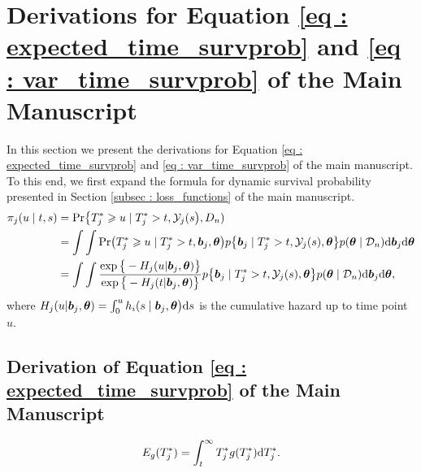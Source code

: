 \section{Derivations for Equation \ref{eq : expected_time_survprob} and \ref{eq : var_time_survprob} of the Main Manuscript}
In this section we present the derivations for Equation \ref{eq : expected_time_survprob} and \ref{eq : var_time_survprob} of the main manuscript. To this end, we first expand the formula for dynamic survival probability presented in Section \ref{subsec : loss_functions} of the main manuscript.
\begin{equation}
\label{eq : dyn_surv_prob_expanded}
\begin{split}
\pi_j(u \mid t, s) &= \mbox{Pr}\big\{T^*_j \geq u \mid  T^*_j >t, \mathcal{Y}_j(s\big), D_n)\\
&= \int \int \mbox{Pr}\big(T^*_j \geq u \mid  T^*_j >t, \bmath{b}_j,\bmath{\theta}\big) p\big\{\bmath{b}_j \mid T^*_j>t, \mathcal{Y}_j(s), \bmath{\theta}\big\} p(\bmath{\theta} \mid \mathcal{D}_n) \rmn{d} \bmath{b}_j \rmn{d} \bmath{\theta}\\
&= \int \int \frac{\exp\big\{-H_j(u | \bmath{b}_j, \bmath{\theta})\big\}}{\exp\big\{-H_j(t | \bmath{b}_j, \bmath{\theta})\big\}} p\big\{\bmath{b}_j \mid T^*_j>t, \mathcal{Y}_j(s), \bmath{\theta}\big\} p(\bmath{\theta} \mid \mathcal{D}_n) \rmn{d} \bmath{b}_j \rmn{d} \bmath{\theta},
\end{split}
\end{equation}
where $H_j(u | \boldsymbol{b}_j, \boldsymbol{\theta}) = \int_0^u h_i(s \mid \boldsymbol{b}_j, \boldsymbol{\theta}\big)\mathrm{d} s$ is the cumulative hazard up to time point $u$.

\subsection{Derivation of Equation \ref{eq : expected_time_survprob} of the Main Manuscript}
\begin{equation*}
E_g(T^*_j) = \int_t^{\infty} T^*_j g(T^*_j)\mathrm{d} T^*_j.
\end{equation*}

